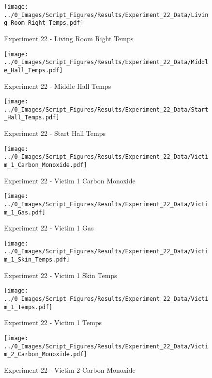 	\clearpage

	\begin{figure}[H]
		\centering
		\texttt{[image: ../0\_Images/Script\_Figures/Results/Experiment\_22\_Data/Living\_Room\_Right\_Temps.pdf]}
		\caption[]{Experiment 22 - Living Room Right Temps}
	\end{figure}
 

	\begin{figure}[H]
		\centering
		\texttt{[image: ../0\_Images/Script\_Figures/Results/Experiment\_22\_Data/Middle\_Hall\_Temps.pdf]}
		\caption[]{Experiment 22 - Middle Hall Temps}
	\end{figure}
 
	\clearpage

	\begin{figure}[H]
		\centering
		\texttt{[image: ../0\_Images/Script\_Figures/Results/Experiment\_22\_Data/Start\_Hall\_Temps.pdf]}
		\caption[]{Experiment 22 - Start Hall Temps}
	\end{figure}
 

	\begin{figure}[H]
		\centering
		\texttt{[image: ../0\_Images/Script\_Figures/Results/Experiment\_22\_Data/Victim\_1\_Carbon\_Monoxide.pdf]}
		\caption[]{Experiment 22 - Victim 1 Carbon Monoxide}
	\end{figure}
 
	\clearpage

	\begin{figure}[H]
		\centering
		\texttt{[image: ../0\_Images/Script\_Figures/Results/Experiment\_22\_Data/Victim\_1\_Gas.pdf]}
		\caption[]{Experiment 22 - Victim 1 Gas}
	\end{figure}
 

	\begin{figure}[H]
		\centering
		\texttt{[image: ../0\_Images/Script\_Figures/Results/Experiment\_22\_Data/Victim\_1\_Skin\_Temps.pdf]}
		\caption[]{Experiment 22 - Victim 1 Skin Temps}
	\end{figure}
 
	\clearpage

	\begin{figure}[H]
		\centering
		\texttt{[image: ../0\_Images/Script\_Figures/Results/Experiment\_22\_Data/Victim\_1\_Temps.pdf]}
		\caption[]{Experiment 22 - Victim 1 Temps}
	\end{figure}
 

	\begin{figure}[H]
		\centering
		\texttt{[image: ../0\_Images/Script\_Figures/Results/Experiment\_22\_Data/Victim\_2\_Carbon\_Monoxide.pdf]}
		\caption[]{Experiment 22 - Victim 2 Carbon Monoxide}
	\end{figure}
 
